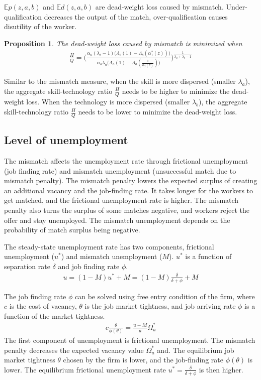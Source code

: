 \documentclass[12pt]{article}
\newtheorem{proposition}{Proposition}
\newcommand{\E}{\mathbb{E}}
\newcommand{\1}{\mathbb{1}}
\begin{document}
$\E p(z,a,b)$ and $\E d(z,a,b)$ are dead-weight loss caused by mismatch. Under-qualification decreases the output of the match, over-qualification causes disutility of the worker. 
\begin{proposition}
The dead-weight loss caused by mismatch is minimized when 
\begin{align*}
\frac{H}{Q} = \Bigg(\frac{\alpha_u(\lambda_b-1)\Big(\Lambda_b(1)-\Lambda_b(\alpha_1^*(z))\Big)}{\alpha_o\lambda_a\Big(\Lambda_a(1)-\Lambda_a(\frac{1}{\alpha_2^*(z)})\Big)}\Bigg)^{\frac{1}{\lambda_a+\lambda_b-1}}
\end{align*}
\end{proposition}
Similar to the mismatch measure, when the skill is more dispersed (smaller $\lambda_a$), the aggregate skill-technology ratio $\frac{H}{Q}$ needs to be higher to minimize the dead-weight loss. When the technology is more dispersed (smaller $\lambda_b$), the aggregate skill-technology ratio $\frac{H}{Q}$ needs to be lower to minimize the dead-weight loss. 


\subsection{Level of unemployment}
The mismatch affects the unemployment rate through frictional unemployment (job finding rate) and mismatch unemployment (unsuccessful match due to mismatch penalty). The mismatch penalty lowers the expected surplus of creating an additional vacancy and the job-finding rate. It takes longer for the workers to get matched, and the frictional unemployment rate is higher. The mismatch penalty also turns the surplus of some matches negative, and workers reject the offer and stay unemployed. The mismatch unemployment depends on the probability of match surplus being negative. 

The steady-state unemployment rate has two components, frictional unemployment ($u^*$) and mismatch unemployment ($M$). $u^*$ is a function of separation rate $\delta$ and job finding rate $\phi$. 
\begin{align}
\label{eqn:unemployment}
u = (1-M)u^*+M =  (1-M)\frac{\delta}{\delta+\phi}+M
\end{align}

The job finding rate $\phi$ can be solved using free entry condition of the firm, where $c$ is the cost of vacancy, $\theta$ is the job market tightness, and job arriving rate $\phi$ is a function of the market tightness. 
\begin{align*}
c\frac{\theta}{\phi(\theta)} = \frac{u-M}{u}\Omega_u^*
\end{align*}
The first component of unemployment is frictional unemployment. The mismatch penalty decreases the expected vacancy value $\Omega_u^*$ and.  The equilibrium job market tightness $\theta$ chosen by the firm is lower, and the job-finding rate $\phi(\theta)$ is lower. The equilibrium frictional unemployment rate $u^* =\frac{\delta}{\delta+\phi}$ is then higher. 
\end{document}
